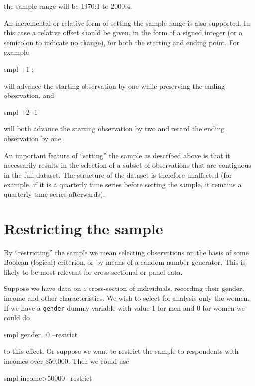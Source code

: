 the sample range will be 1970:1 to 2000:4.  

An incremental or relative form of setting the sample range is also
supported.  In this case a relative offset should be given, in the
form of a signed integer (or a semicolon to indicate no change), for
both the starting and ending point. For example

\begin{code}
smpl +1 ;
\end{code}

will advance the starting observation by one while preserving the
ending observation, and

\begin{code}
smpl +2 -1
\end{code}

will both advance the starting observation by two and retard the
ending observation by one.

An important feature of ``setting'' the sample as described above is
that it necessarily results in the selection of a subset of
observations that are contiguous in the full dataset. The structure of
the dataset is therefore unaffected (for example, if it is a quarterly
time series before setting the sample, it remains a quarterly time
series afterwards).

\section{Restricting the sample}
\label{sample-restrict}

By ``restricting'' the sample we mean selecting observations on the
basis of some Boolean (logical) criterion, or by means of a random
number generator.  This is likely to be most relevant for
cross-sectional or panel data.

Suppose we have data on a cross-section of individuals, recording
their gender, income and other characteristics.  We wish to select for
analysis only the women.  If we have a \verb+gender+ dummy variable
with value 1 for men and 0 for women we could do
%      
\begin{code}
smpl gender=0 --restrict
\end{code}
%
to this effect.  Or suppose we want to restrict the sample to
respondents with incomes over \$50,000.  Then we could use
%
\begin{code}
smpl income>50000 --restrict
\end{code}

